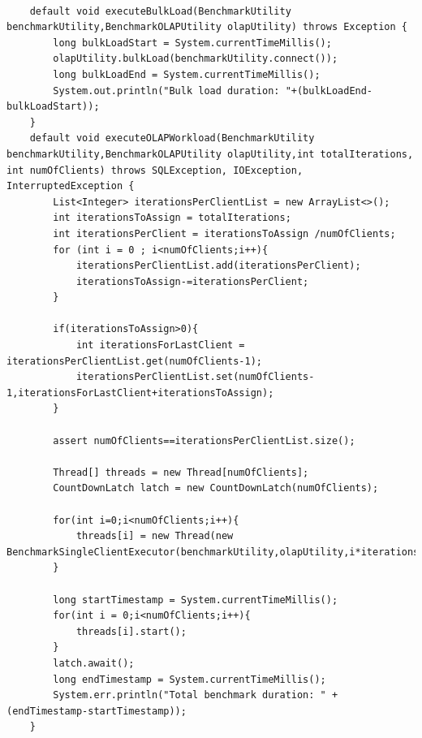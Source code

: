 \documentclass[12pt,oneside]{memoir}
\begin{document}
\begin{lstlisting}[title={hbase-setup-model},captionpos=t]

    default void executeBulkLoad(BenchmarkUtility benchmarkUtility,BenchmarkOLAPUtility olapUtility) throws Exception {
        long bulkLoadStart = System.currentTimeMillis();
        olapUtility.bulkLoad(benchmarkUtility.connect());
        long bulkLoadEnd = System.currentTimeMillis();
        System.out.println("Bulk load duration: "+(bulkLoadEnd-bulkLoadStart));
    }
    default void executeOLAPWorkload(BenchmarkUtility benchmarkUtility,BenchmarkOLAPUtility olapUtility,int totalIterations, int numOfClients) throws SQLException, IOException, InterruptedException {
        List<Integer> iterationsPerClientList = new ArrayList<>();
        int iterationsToAssign = totalIterations;
        int iterationsPerClient = iterationsToAssign /numOfClients;
        for (int i = 0 ; i<numOfClients;i++){
            iterationsPerClientList.add(iterationsPerClient);
            iterationsToAssign-=iterationsPerClient;
        }

        if(iterationsToAssign>0){
            int iterationsForLastClient = iterationsPerClientList.get(numOfClients-1);
            iterationsPerClientList.set(numOfClients-1,iterationsForLastClient+iterationsToAssign);
        }

        assert numOfClients==iterationsPerClientList.size();

        Thread[] threads = new Thread[numOfClients];
        CountDownLatch latch = new CountDownLatch(numOfClients);

        for(int i=0;i<numOfClients;i++){
            threads[i] = new Thread(new BenchmarkSingleClientExecutor(benchmarkUtility,olapUtility,i*iterationsPerClientList.get(i),iterationsPerClientList.get(i),latch));
        }

        long startTimestamp = System.currentTimeMillis();
        for(int i = 0;i<numOfClients;i++){
            threads[i].start();
        }
        latch.await();
        long endTimestamp = System.currentTimeMillis();
        System.err.println("Total benchmark duration: " + (endTimestamp-startTimestamp));
    }
\end{lstlisting}


\end{document}

